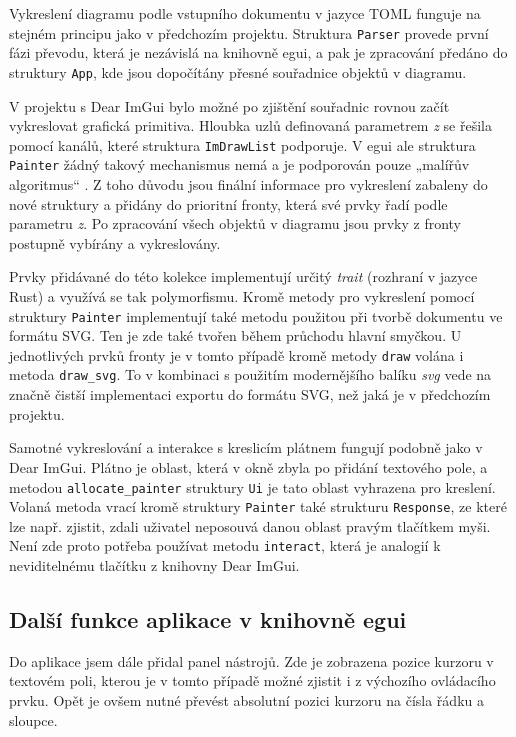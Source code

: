 \documentclass[FM,DP]{tulthesis}
\begin{document}
	Vykreslení diagramu podle vstupního dokumentu v jazyce TOML funguje na stejném principu jako v předchozím projektu. Struktura \texttt{Parser} provede první fázi převodu, která je nezávislá na knihovně egui, a pak je zpracování předáno do struktury \texttt{App}, kde jsou dopočítány přesné souřadnice objektů v diagramu.%
	
	V projektu s Dear ImGui bylo možné po zjištění souřadnic rovnou začít vykreslovat grafická primitiva. Hloubka uzlů definovaná parametrem \textit{z} se řešila pomocí kanálů, které struktura \texttt{ImDrawList} podporuje. V egui ale struktura \texttt{Painter} žádný takový mechanismus nemá a je podporován pouze „malířův algoritmus“ \cite{online_eguizorder}. Z toho důvodu jsou finální informace pro vykreslení zabaleny do nové struktury a přidány do prioritní fronty, která své prvky řadí podle parametru \textit{z}. Po zpracování všech objektů v diagramu jsou prvky z fronty postupně vybírány a vykreslovány.
	
	Prvky přidávané do této kolekce implementují určitý \textit{trait} (rozhraní v jazyce Rust) a využívá se tak polymorfismu. Kromě metody pro vykreslení pomocí \mbox{struktury} \texttt{Painter} implementují také metodu použitou při tvorbě dokumentu ve formátu SVG. Ten je zde také tvořen během průchodu hlavní smyčkou. U jednotlivých prvků fronty je v tomto případě kromě metody \texttt{draw} volána i metoda \texttt{draw\_svg}. To v kombinaci s použitím modernějšího balíku \textit{svg} vede na značně čistší implementaci exportu do formátu SVG, než jaká je v předchozím projektu.

	Samotné vykreslování a interakce s kreslicím plátnem fungují podobně jako v Dear ImGui. Plátno je oblast, která v okně zbyla po přidání textového pole, a metodou \texttt{allocate\_painter} struktury \texttt{Ui} je tato oblast vyhrazena pro kreslení. Volaná metoda vrací kromě struktury \texttt{Painter} také strukturu \texttt{Response}, ze které lze např. zjistit, zdali uživatel neposouvá danou oblast pravým tlačítkem myši. Není zde proto potřeba používat metodu \texttt{interact}, která je analogií k neviditelnému tlačítku z knihovny Dear ImGui.
	
	\subsection{Další funkce aplikace v knihovně egui}

	Do aplikace jsem dále přidal panel nástrojů. Zde je zobrazena pozice kurzoru v textovém poli, kterou je v tomto případě možné zjistit i z výchozího ovládacího prvku. Opět je ovšem nutné převést absolutní pozici kurzoru na čísla řádku a sloupce.
		
\end{document}
